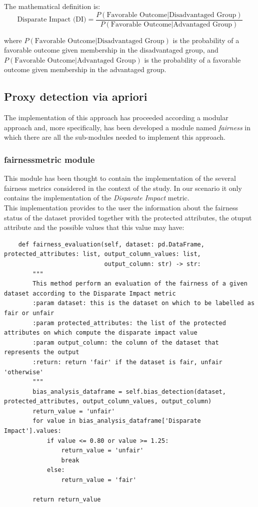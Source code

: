 \documentclass[12pt,a4paper,openright,twoside]{book}
\begin{document}
The mathematical definition is:
\[
\text{Disparate Impact (DI)} = \frac{P(\text{Favorable Outcome} | \text{Disadvantaged Group})}{P(\text{Favorable Outcome} | \text{Advantaged Group})}
\]

where $P(\text{Favorable Outcome} | \text{Disadvantaged Group})$ is the probability of a favorable outcome given membership in the disadvantaged group, and  \\ $P(\text{Favorable Outcome} | \text{Advantaged Group})$ is the probability of a favorable outcome given membership in the advantaged group.
\subsection{Proxy detection via apriori}
The implementation of this approach has proceeded according a modular approach and, more specifically, has been developed a module named \emph{fairness} in which there are all the sub-modules needed to implement this approach.
\subsubsection{fairness\textunderscore metric module}
This module has been thought to contain the implementation of the several fairness metrics considered in the context of the study. In our scenario it only contains the implementation of the \emph{Disparate Impact} metric. \\
This implementation provides to the user the information about the fairness status of the dataset provided together with the protected attributes, the otuput attribute and the possible values that this value may have: \\
\begin{lstlisting}
    def fairness_evaluation(self, dataset: pd.DataFrame, protected_attributes: list, output_column_values: list,
                            output_column: str) -> str:
        """
        This method perform an evaluation of the fairness of a given dataset according to the Disparate Impact metric
        :param dataset: this is the dataset on which to be labelled as fair or unfair
        :param protected_attributes: the list of the protected attributes on which compute the disparate impact value
        :param output_column: the column of the dataset that represents the output
        :return: return 'fair' if the dataset is fair, unfair 'otherwise'
        """
        bias_analysis_dataframe = self.bias_detection(dataset, protected_attributes, output_column_values, output_column)
        return_value = 'unfair'
        for value in bias_analysis_dataframe['Disparate Impact'].values:
            if value <= 0.80 or value >= 1.25:
                return_value = 'unfair'
                break
            else:
                return_value = 'fair'

        return return_value
\end{lstlisting}
\end{document}
